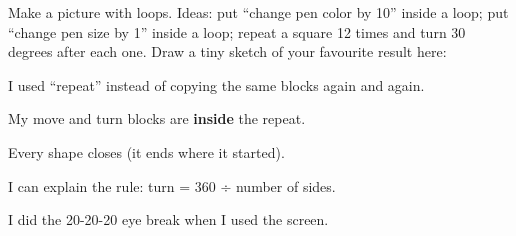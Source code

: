 \begin{creative}
Make a picture with loops. Ideas: put \enquote{change pen color by 10} inside a loop; put \enquote{change pen size by 1} inside a loop; repeat a square 12 times and turn 30 degrees after each one. Draw a tiny sketch of your favourite result here:
\answerspace{3cm}
\end{creative}

\begin{selfcheck}
  \item I used \enquote{repeat} instead of copying the same blocks again and again.
  \item My move and turn blocks are \textbf{inside} the repeat.
  \item Every shape closes (it ends where it started).
  \item I can explain the rule: turn = 360 ÷ number of sides.
  \item I did the 20-20-20 eye break when I used the screen.
\end{selfcheck}
